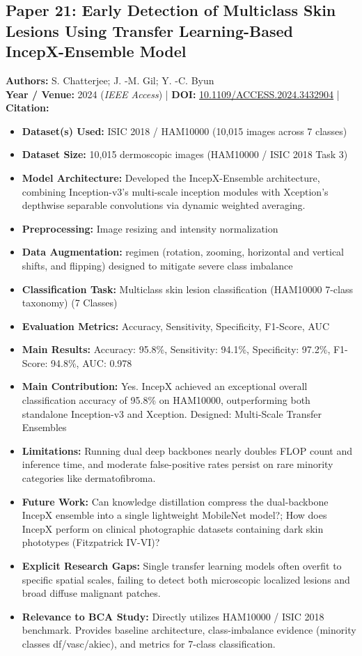 \documentclass[11pt,a4paper]{article}
\begin{document}
\subsection{Paper 21: Early Detection of Multiclass Skin Lesions Using Transfer Learning-Based IncepX-Ensemble Model}
\textbf{Authors:} S. Chatterjee; J. -M. Gil; Y. -C. Byun \\
\textbf{Year / Venue:} 2024 (\textit{IEEE Access}) | \textbf{DOI:} \href{https://doi.org/10.1109/ACCESS.2024.3432904}{10.1109/ACCESS.2024.3432904} | \textbf{Citation:} \cite{10608138}

\begin{itemize}\small
\item \textbf{Dataset(s) Used:} ISIC 2018 / HAM10000 (10,015 images across 7 classes)
\item \textbf{Dataset Size:} 10,015 dermoscopic images (HAM10000 / ISIC 2018 Task 3)
\item \textbf{Model Architecture:} Developed the IncepX-Ensemble architecture, combining Inception-v3's multi-scale inception modules with Xception's depthwise separable convolutions via dynamic weighted averaging.
\item \textbf{Preprocessing:} Image resizing and intensity normalization
\item \textbf{Data Augmentation:} regimen (rotation, zooming, horizontal and vertical shifts, and flipping) designed to mitigate severe class imbalance
\item \textbf{Classification Task:} Multiclass skin lesion classification (HAM10000 7-class taxonomy) (7 Classes)
\item \textbf{Evaluation Metrics:} Accuracy, Sensitivity, Specificity, F1-Score, AUC
\item \textbf{Main Results:} Accuracy: 95.8\%, Sensitivity: 94.1\%, Specificity: 97.2\%, F1-Score: 94.8\%, AUC: 0.978
\item \textbf{Main Contribution:} Yes. IncepX achieved an exceptional overall classification accuracy of 95.8\% on HAM10000, outperforming both standalone Inception-v3 and Xception. Designed: Multi-Scale Transfer Ensembles
\item \textbf{Limitations:} Running dual deep backbones nearly doubles FLOP count and inference time, and moderate false-positive rates persist on rare minority categories like dermatofibroma.
\item \textbf{Future Work:} Can knowledge distillation compress the dual-backbone IncepX ensemble into a single lightweight MobileNet model?; How does IncepX perform on clinical photographic datasets containing dark skin phototypes (Fitzpatrick IV-VI)?
\item \textbf{Explicit Research Gaps:} Single transfer learning models often overfit to specific spatial scales, failing to detect both microscopic localized lesions and broad diffuse malignant patches.
\item \textbf{Relevance to BCA Study:} Directly utilizes HAM10000 / ISIC 2018 benchmark. Provides baseline architecture, class-imbalance evidence (minority classes df/vasc/akiec), and metrics for 7-class classification.
\end{itemize}
\end{document}
